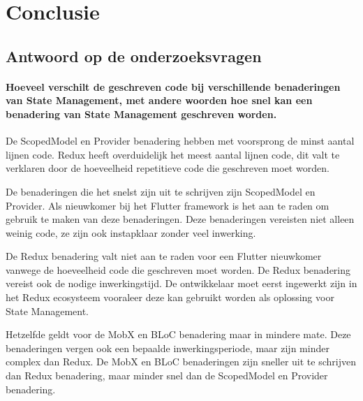 
\chapter{Conclusie}
\label{ch:conclusie}


\section{Antwoord op de onderzoeksvragen}
\subsubsection{Hoeveel verschilt de geschreven code bij verschillende benaderingen van State Management, met andere woorden hoe snel kan een benadering van State Management geschreven worden.}
De ScopedModel en Provider benadering hebben met voorsprong de minst aantal lijnen code. Redux heeft overduidelijk het meest aantal lijnen code, dit valt te verklaren door de hoeveelheid repetitieve code die geschreven moet worden. 

De benaderingen die het snelst zijn uit te schrijven zijn ScopedModel en Provider. Als nieuwkomer bij het Flutter framework is het aan te raden om gebruik te maken van deze benaderingen. Deze benaderingen vereisten niet alleen weinig code, ze zijn ook instapklaar zonder veel inwerking.  

De Redux benadering valt niet aan te raden voor een Flutter nieuwkomer vanwege de hoeveelheid code die geschreven moet worden. De Redux benadering vereist ook de nodige inwerkingstijd. De ontwikkelaar moet eerst ingewerkt zijn in het Redux ecosysteem vooraleer deze kan gebruikt worden als oplossing voor State Management. 

Hetzelfde geldt voor de MobX en BLoC benadering maar in mindere mate. Deze benaderingen vergen ook een bepaalde inwerkingsperiode, maar zijn minder complex dan Redux. De MobX en BLoC benaderingen zijn sneller uit te schrijven dan Redux benadering, maar minder snel dan de ScopedModel en Provider benadering.

